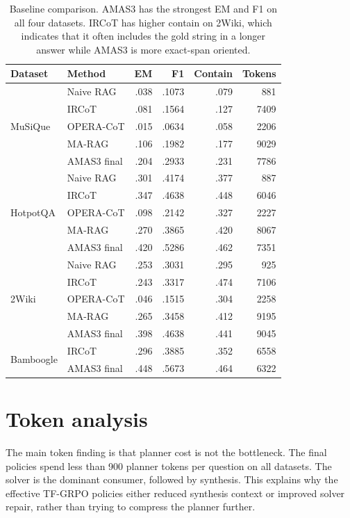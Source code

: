 \documentclass[10pt]{article}
\begin{document}
\begin{table}[H]
\centering
\small
\begin{tabular}{llrrrr}
\toprule
Dataset & Method & EM & F1 & Contain & Tokens \\
\midrule
\multirow{5}{*}{MuSiQue} & Naive RAG & .038 & .1073 & .079 & 881 \\
 & IRCoT & .081 & .1564 & .127 & 7409 \\
 & OPERA-CoT & .015 & .0634 & .058 & 2206 \\
 & MA-RAG & .106 & .1982 & .177 & 9029 \\
 & AMAS3 final & .204 & .2933 & .231 & 7786 \\
\midrule
\multirow{5}{*}{HotpotQA} & Naive RAG & .301 & .4174 & .377 & 887 \\
 & IRCoT & .347 & .4638 & .448 & 6046 \\
 & OPERA-CoT & .098 & .2142 & .327 & 2227 \\
 & MA-RAG & .270 & .3865 & .420 & 8067 \\
 & AMAS3 final & .420 & .5286 & .462 & 7351 \\
\midrule
\multirow{5}{*}{2Wiki} & Naive RAG & .253 & .3031 & .295 & 925 \\
 & IRCoT & .243 & .3317 & .474 & 7106 \\
 & OPERA-CoT & .046 & .1515 & .304 & 2258 \\
 & MA-RAG & .265 & .3458 & .412 & 9195 \\
 & AMAS3 final & .398 & .4638 & .441 & 9045 \\
\midrule
\multirow{2}{*}{Bamboogle} & IRCoT & .296 & .3885 & .352 & 6558 \\
 & AMAS3 final & .448 & .5673 & .464 & 6322 \\
\bottomrule
\end{tabular}
\caption{Baseline comparison. AMAS3 has the strongest EM and F1 on all four datasets. IRCoT has higher contain on 2Wiki, which indicates that it often includes the gold string in a longer answer while AMAS3 is more exact-span oriented.}
\label{tab:baselines}
\end{table}

\section{Token analysis}

The main token finding is that planner cost is not the bottleneck. The final policies spend less than 900 planner tokens per question on all datasets. The solver is the dominant consumer, followed by synthesis. This explains why the effective TF-GRPO policies either reduced synthesis context or improved solver repair, rather than trying to compress the planner further.
\end{document}
